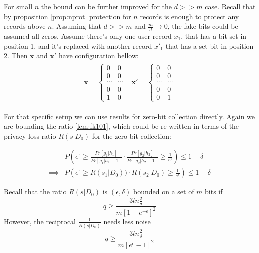\documentclass[11pt]{article}
\newcommand{\bbx}{\pmb{x}}
\begin{document}
For small $n$ the bound can be further improved for the $d >> m$ case.  Recall that by proposition \ref{prop:nprot} protection for $n$ records is enough to protect any records above $n$.   Assuming that  $d >> m$ and $ \frac{m}{d} \rightarrow 0$, the fake bits could be assumed all zeros.  Assume there's only one user record $x_1$, that has a bit set in position 1, and it's replaced with another record $x'_1$ that has a set bit in position 2.   Then $\bbx$ and $\bbx'$ have configuration bellow:
\begin{align*}
\begin{matrix}
\bbx =  \left\{\begin{matrix}
0 & 0 \\
0 & 0 \\
\cdots & \cdots \\
0 & 0\\
1 & 0
\end{matrix}\right.
&
\bbx' =  \left\{\begin{matrix}
0 & 0 \\
0 & 0 \\
\cdots & \cdots \\
0 & 0\\
0 & 1
\end{matrix}\right.
\end{matrix}
\end{align*}

For that specific setup we can use results for zero-bit collection directly.   Again we are bounding the ratio \ref{lem:fk101}, which could be re-written in terms of the privacy loss ratio $R(s|D_0)$ for the zero bit collection:

\begin{align} \label{lem:fk202}
& P \left (   e^\epsilon \ge \frac{  Pr[ g_1 | h_1]  } {  Pr[ g_1 | h_1 - 1]  } \cdot \frac{  Pr[ g_2 | h_2]  } {  Pr[ g_2 | h_2 + 1]  }  \ge \frac{1}{e^\epsilon} \right ) \le 1 - \delta  \\
\implies & P \left (   e^\epsilon \ge R(s_1|D_0)) \cdot R(s_2|D_0) \ge \frac{1}{e^\epsilon} \right ) \le 1 - \delta 
\end{align}

Recall that the ratio $R(s|D_0)$ is $(\epsilon, \delta)$ bounded on a set of $m$ bits if
\[  q \ge \frac  { 3  ln\frac{2}{\delta}}  { m\left [ 1 - e^{-\epsilon}\right ] ^2}  \]
However, the reciprocal $\frac{1}{R(s|D_0)}$ needs less noise
\[  q \ge \frac  { 3  ln\frac{2}{\delta}}  { m\left [e^{\epsilon} - 1 \right ] ^2}  \]

\newpage
\end{document}
